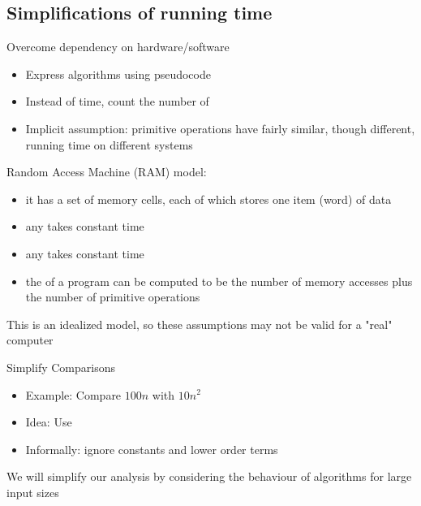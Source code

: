\documentclass[letterpaper, 12pt]{article}
\newcommand{\red}[1]{{\color{red}{#1}}}
\begin{document}
    \subsection{Simplifications of running time}
    Overcome dependency on hardware/software
    \begin{itemize}
        \item Express algorithms using pseudocode
        \item Instead of time, count the number of \red{primitive operations}
        \item Implicit assumption: primitive operations have fairly similar, though different, running time on different systems
    \end{itemize}
    Random Access Machine (RAM) model:
    \begin{itemize}
        \item it has a set of memory cells, each of which stores one item (word) of data
        \item any \red{access to a memory location} takes constant time
        \item any \red{primitive operation} takes constant time
        \item the \red{running time} of a program can be computed to be the number of memory accesses plus the number of primitive operations
    \end{itemize}
    This is an idealized model, so these assumptions may not be valid for a "real" computer\\
    \bigskip

    Simplify Comparisons
    \begin{itemize}
        \item Example: Compare $100n$ with $10n^2$
        \item Idea: Use \red{order notation}
        \item Informally: ignore constants and lower order terms 
    \end{itemize}
    We will simplify our analysis by considering the behaviour of algorithms for large input sizes
    \pagebreak
    
\end{document}
